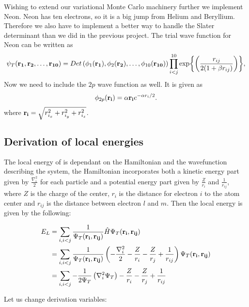 \documentclass[x11names]{article}
\begin{document}
		Wishing to extend our variational Monte Carlo machinery further we implement Neon. Neon has ten electrons, so it is a big jump from Helium and Beryllium. Therefore we also have to implement a better way to handle the Slater determinant than we did in the previous project. The trial wave function for Neon can be written as
		\begin{equation}
		   \psi_{T}({\bf r_1},{\bf r_2}, \dots,{\bf r_{10}}) =
		   Det\left(\phi_{1}({\bf r_1}),\phi_{2}({\bf r_2}),
		   \dots,\phi_{10}({\bf r_{10}})\right)
		   \prod_{i<j}^{10}\exp{\left(\frac{r_{ij}}{2(1+\beta r_{ij})}\right)},
		   \label{eq:NeonTrialFunction}
		\end{equation}
		Now we need to include the $2p$ wave function as well. It is given as
		\begin{equation}
			\phi_{2p}({\bf r_i}) = \alpha {\bf r_i}e^{-\alpha r_i/2}.
		\end{equation}
		where $ {\bf r_i} = \sqrt{r_{i_x}^2+r_{i_y}^2+r_{i_z}^2}$.

	\subsection{Derivation of local energies}
		The local energy of is dependant on the Hamiltonian and the wavefunction describing the system, the Hamiltonian incorporates both a kinetic energy part given by \( \frac{\nabla_i^2}{2} \) for each particle
		and a potential energy part given by \(\frac{Z}{r_i}\) and \(\frac{1}{r_{ij}}\), where \(Z\) is the charge of the center, \(r_i\) is the distance for electron \(i\) to the atom center and \(r_{ij}\) is the distance between electron \(l\) and \(m\). Then the local energy is given by the following:

		\begin{align}
			E_L &= \sum_{i,i<j}{\frac{1}{ \Psi_T(\vb{r_i} , \vb{r_{ij}}) } \hat{H} \Psi_T(\vb{r_i} , \vb{r_{ij}})}
			\\
			&=	\sum_{i,i<j}\frac{1}{ \Psi_T(\vb{r_i} , \vb{r_{ij}}) } \left( - \frac{\nabla_i^2}{2} -\frac{Z}{r_i}  -  \frac{Z}{r_j} +  \frac{1}{r_{ij} }  \right) \Psi_T(\vb{r_i} , \vb{r_{ij}})
			\\
			&= \sum_{i,i<j}{-\frac{1}{2\Psi_T} \left(\nabla_i^2 \Psi_T  \right)  -\frac{Z}{r_i}  -  \frac{Z}{r_j} +  \frac{1}{r_{ij} }}
		\end{align}

		Let us change derivation variables:
\end{document}
